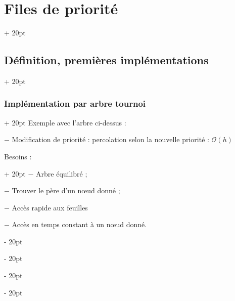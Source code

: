 \documentclass[a4paper, 12pt, twoside]{article}
\newcommand{\ind}[1][20pt]{\advance\leftskip + #1}
\newcommand{\deind}[1][20pt]{\advance\leftskip - #1}
\newenvironment{indt}[2][20pt]{#2 \par \ind[#1]}{\par \deind} %
\begin{document}
\begin{indt}{\section{Files de priorité}}
\begin{indt}{\subsection{Définition, premières implémentations}}
\begin{indt}{\subsubsection{Implémentation par arbre tournoi}}
                Exemple avec l'arbre ci-dessus :
                \begin{center}
                \end{center}
                
                $-$ Modification de priorité : percolation selon la nouvelle priorité : $\mathcal O(h)$
                
                \vspace{12pt}
                
                \begin{indt}{Besoins :}
                    $-$ Arbre équilibré ;
                    
                    $-$ Trouver le père d'un n\oe ud donné ;
                    
                    $-$ Accès rapide aux feuilles
                    
                    $-$ Accès en temps constant à un n\oe ud donné.
                \end{indt}
            \end{indt}
        \end{indt}
        
        \vspace{12pt}
        

\end{indt}
\end{document}

